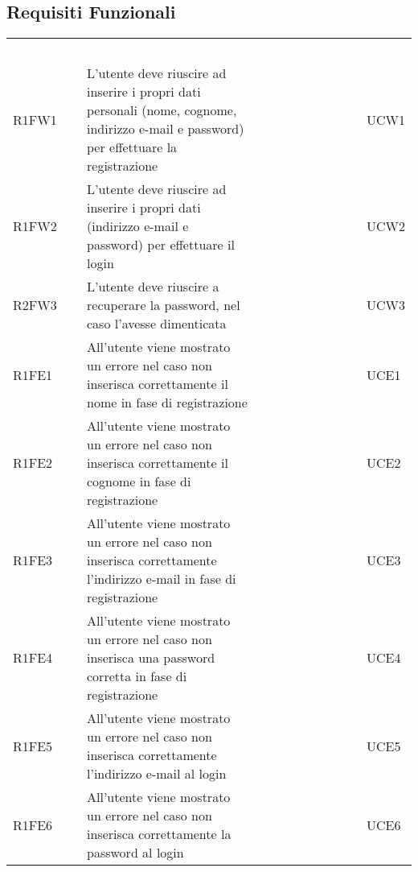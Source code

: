\subsection{Requisiti Funzionali}


\renewcommand{\arraystretch}{1.5}
\begin{longtable}{ m{}<{\centering}  m{}<{\centering}  m{}<{\centering}  m{}<{\centering}}
	\rowcolor{darkblue}
	\textcolor{white}{\textbf{Requisito}} &\textcolor{white}{\textbf{Descrizione}}& \textcolor{white}{\textbf{Classificazione}} & \textcolor{white}{\textbf{Fonti}}\\ 

	R1FW1 & L’utente deve riuscire ad inserire i propri dati personali (nome, cognome, indirizzo e-mail e password) per effettuare la registrazione & \Ob & UCW1 \\	
	 
	R1FW2 & L’utente deve riuscire ad inserire i propri dati (indirizzo e-mail e password) per effettuare il login & \Ob & UCW2\\	

	R2FW3 & L’utente deve riuscire a recuperare la password, nel caso l’avesse dimenticata & \De & UCW3\\	
	 
	R1FE1 & All’utente viene mostrato un errore nel caso non inserisca correttamente il nome in fase di registrazione & \Ob & UCE1\\	
	 
 	R1FE2 & All’utente viene mostrato un errore nel caso non inserisca correttamente il cognome in fase di registrazione & \Ob & UCE2\\	
	 
	R1FE3 & All’utente viene mostrato un errore nel caso non inserisca correttamente l’indirizzo e-mail in fase di registrazione & \Ob & UCE3\\	

	R1FE4 & All’utente viene mostrato un errore nel caso non inserisca una password corretta in fase di registrazione & \Ob & UCE4\\	
	
	R1FE5 & All'utente viene mostrato un errore nel caso non inserisca correttamente l'indirizzo e-mail al login & \Ob & UCE5 \\
	 
	R1FE6 & All'utente viene mostrato un errore nel caso non inserisca correttamente la password al login & \Ob & UCE6 \\	 
	 

\end{longtable}
